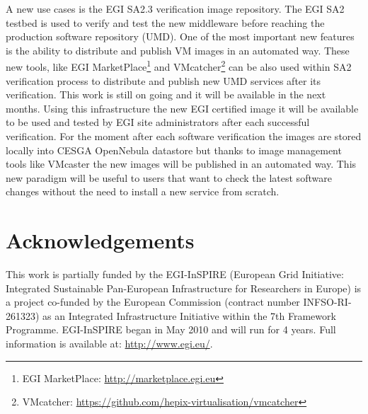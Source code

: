 \documentclass[oribibl]{llncs_Ibergrid2013}
\begin{document}
A new use cases is the EGI SA2.3 verification image repository. The EGI SA2 testbed is used to verify and test the new middleware before reaching the production software repository (UMD).
One of the most important new features is the ability to distribute and publish VM images in an automated way. 
These new tools, like EGI MarketPlace\footnote{EGI MarketPlace: \url{http://marketplace.egi.eu}} and VMcatcher\footnote{VMcatcher: \url{https://github.com/hepix-virtualisation/vmcatcher}} can be also used within SA2 verification process to distribute and publish new UMD services after its verification. 
This work is still on going and it will be available in the next months. Using this infrastructure the new EGI certified image it will be available to be used and tested by EGI site administrators after each successful verification.
For the moment after each software verification the images are stored locally into CESGA OpenNebula datastore but thanks to image management tools like VMcaster the new images will be published in an automated way.
This new paradigm will be useful to users that want to check the latest software changes without the need to install a new service from scratch.


\section*{Acknowledgements}
\label{sect-acknowledgements}
This work is partially funded by the  EGI-InSPIRE (European Grid Initiative: Integrated Sustainable
Pan-European Infrastructure for Researchers in Europe) is a project co-funded by the European Commission 
(contract number INFSO-RI-261323) as an Integrated Infrastructure Initiative within the 7th Framework 
Programme. EGI-InSPIRE began in May 2010 and will run for 4 years. Full information is available at:
\url{http://www.egi.eu/}.

%
%
%


\end{document}
